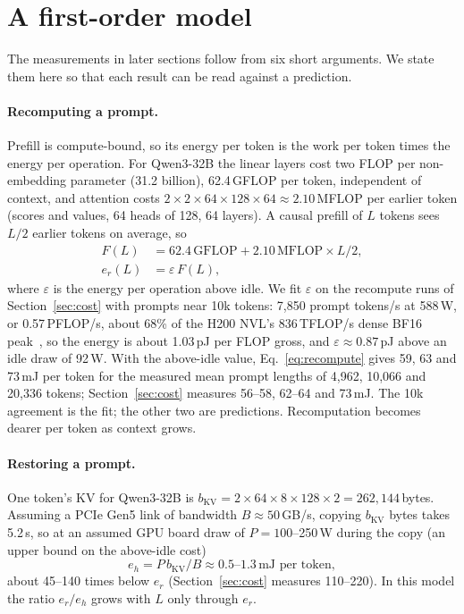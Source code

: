 \section{A first-order model}
\label{sec:model}

The measurements in later sections follow from six short arguments. We state them here so that each result can be
read against a prediction.

\paragraph{Recomputing a prompt.} Prefill is compute-bound, so its energy per token is the work per token times the
energy per operation. For Qwen3-32B the linear layers cost two FLOP per non-embedding parameter (31.2 billion), 62.4\,GFLOP per token, independent of
context, and attention costs $2\times2\times64\times128\times64 \approx 2.10$\,MFLOP per earlier token (scores and values, 64 heads of 128, 64 layers). A causal prefill of
$L$ tokens sees $L/2$ earlier tokens on average, so
\begin{equation}
  \begin{aligned}
  F(L) &= 62.4\,\text{GFLOP} + 2.10\,\text{MFLOP}\times L/2,\\
  e_r(L) &= \varepsilon\,F(L),
  \end{aligned}
  \label{eq:recompute}
\end{equation}
where $\varepsilon$ is the energy per operation above idle. We fit $\varepsilon$ on the recompute runs of Section~\ref{sec:cost} with prompts
near 10k tokens: 7,850 prompt tokens/s at 588\,W, or 0.57\,PFLOP/s, about 68\% of the H200 NVL's 836\,TFLOP/s dense
BF16 peak~\cite{nvidia2024h200}, so the energy is about 1.03\,pJ per FLOP gross, and $\varepsilon\approx0.87$\,pJ above an idle draw of
92\,W. With the above-idle value, Eq.~\eqref{eq:recompute} gives 59, 63 and 73\,mJ per token for the measured mean prompt lengths of 4,962, 10,066
and 20,336 tokens; Section~\ref{sec:cost} measures 56--58, 62--64 and 73\,mJ. The 10k agreement is the fit; the other
two are predictions. Recomputation becomes dearer per token as context grows.

\paragraph{Restoring a prompt.} One token's KV for Qwen3-32B is $b_{\text{KV}}=2\times64\times8\times128\times2 = 262{,}144$\,bytes.
Assuming a PCIe Gen5 link of bandwidth $B\approx50$\,GB/s, copying $b_{\text{KV}}$ bytes takes 5.2\,\textmu s, so at an
assumed GPU board draw of $P=100$--250\,W during the copy (an upper bound on the above-idle cost)
\begin{equation}
  e_h = P\,b_{\text{KV}}/B \approx 0.5\text{--}1.3\,\text{mJ per token},
  \label{eq:restore}
\end{equation}
about 45--140 times below $e_r$ (Section~\ref{sec:cost} measures 110--220). In this model the ratio $e_r/e_h$ grows with $L$ only through $e_r$.

